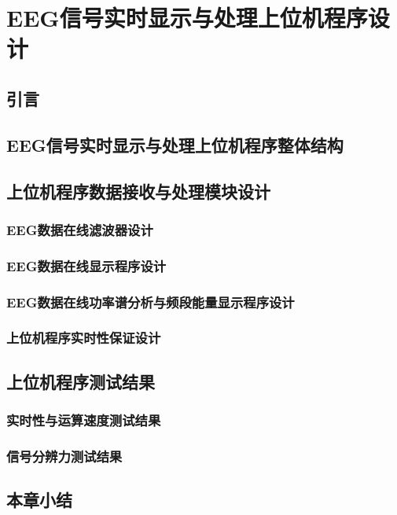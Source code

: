\chapter{EEG信号实时显示与处理上位机程序设计}

    \section{引言}

    \section{EEG信号实时显示与处理上位机程序整体结构}

    \section{上位机程序数据接收与处理模块设计}

        \subsection{EEG数据在线滤波器设计}

        \subsection{EEG数据在线显示程序设计}

        \subsection{EEG数据在线功率谱分析与频段能量显示程序设计}

        \subsection{上位机程序实时性保证设计}

    \section{上位机程序测试结果}
        
        \subsection{实时性与运算速度测试结果}

        \subsection{信号分辨力测试结果}

    \section{本章小结}